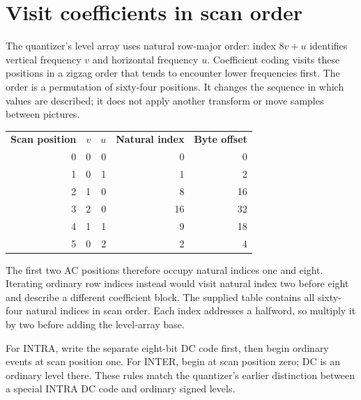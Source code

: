 \section{Visit coefficients in scan order}
The quantizer's level array uses natural row-major order: index $8v+u$ identifies
vertical frequency $v$ and horizontal frequency $u$. Coefficient coding visits
these positions in a zigzag order that tends to encounter lower frequencies first.
The order is a permutation of sixty-four positions. It changes the sequence in
which values are described; it does not apply another transform or move samples
between pictures.

\begin{center}
  \begin{tabular}{rrrrr}
    \textbf{Scan position} & \textbf{$v$} & \textbf{$u$} & \textbf{Natural index} & \textbf{Byte offset} \\
    0                      & 0            & 0            & 0                      & 0                    \\
    1                      & 0            & 1            & 1                      & 2                    \\
    2                      & 1            & 0            & 8                      & 16                   \\
    3                      & 2            & 0            & 16                     & 32                   \\
    4                      & 1            & 1            & 9                      & 18                   \\
    5                      & 0            & 2            & 2                      & 4
  \end{tabular}
\end{center}
The first two AC positions therefore occupy natural indices one and eight.
Iterating ordinary row indices instead would visit natural index two before
eight and describe a different coefficient block. The supplied table contains
all sixty-four natural indices in scan order. Each index addresses a halfword,
so multiply it by two before adding the level-array base.

For INTRA, write the separate eight-bit DC code first, then begin ordinary events
at scan position one. For INTER, begin at scan position zero; DC is an ordinary
level there. These rules match the quantizer's earlier distinction between a
special INTRA DC code and ordinary signed levels.

